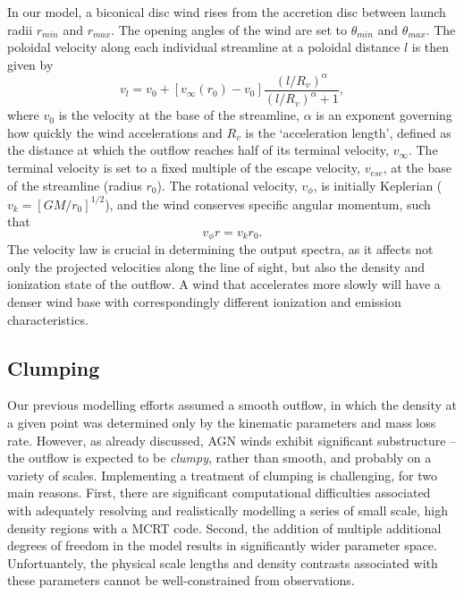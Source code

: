 \documentclass[useAMS,usenatbib]{mn2e_x}
\begin{document}
In our model, a biconical disc wind rises from the accretion 
disc between launch radii $r_{min}$ and $r_{max}$.
The opening angles of the wind are set to $\theta_{min}$ and $\theta_{max}$.
The poloidal velocity along each individual streamline at a poloidal distance $l$ 
is then given by
\begin{equation}
v_l=v_0+\left[v_{\infty}(r_0)-v_0\right]\frac{\left(l/R_v\right)^{\alpha}}{\left(l/R_v\right)^{\alpha}+1},
\label{v_law}
\end{equation}
where $v_0$ is the velocity at the base of the streamline, $\alpha$ is
an exponent governing how quickly the wind accelerations and 
$R_v$ is the `acceleration length', defined as the distance at which
the outflow reaches half of its terminal velocity, $v_{\infty}$.
The terminal velocity is set to a fixed multiple of the escape
velocity, $v_{esc}$, at the base of the streamline (radius $r_0$).
The rotational velocity, $v_{\phi}$, is initially Keplerian ($v_k = [GM/r_0]^{1/2}$),
and the wind conserves specific angular momentum, such that 
\begin{equation}
v_{\phi} r = v_k r_0.
\label{v_law}
\end{equation}
The velocity law is crucial in determining the output spectra,
as it affects not only the projected velocities along the line of sight,
but also the density and ionization state of the outflow.
A wind that accelerates more slowly will have a denser wind base
with correspondingly different ionization and emission characteristics.

\subsection{Clumping}

Our previous modelling efforts assumed a smooth outflow, 
in which the density at a given point was determined only by the 
kinematic parameters and mass loss rate. However, as already discussed,
AGN winds exhibit significant substructure -- the outflow is expected to be
{\em clumpy}, rather than smooth, and probably on a variety of scales. 
Implementing a treatment of clumping is challenging, for
two main reasons. First, there are significant 
computational difficulties associated with adequately
resolving and realistically modelling a series of small scale, high density
regions with a MCRT code. Second, the addition of multiple additional degrees of
freedom in the model results in significantly wider parameter space.
Unfortuantely, the physical scale lengths and density contrasts 
associated with these parameters cannot be well-constrained from observations.
\end{document}
